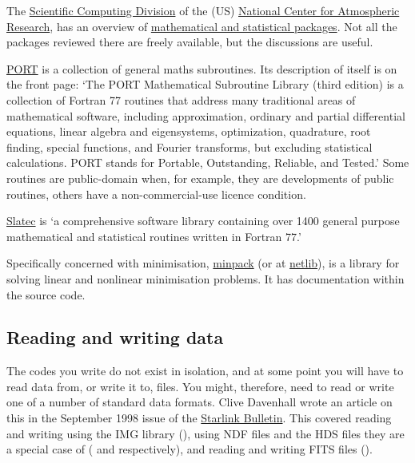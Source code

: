 \documentclass[11pt,oneside,chapters]{starlink}
\begin{document}
The
\href{http://www.scd.ucar.edu/}{Scientific Computing Division}
of the (US)
\href{http://www.ncar.ucar.edu/}{National Center for Atmospheric Research},
has an overview of
\href{http://www.scd.ucar.edu/softlib/mathlib.html}{mathematical and statistical packages}.
Not all the packages
reviewed there are freely available, but the discussions are
useful.

\href{http://www.bell-labs.com/project/PORT/}{PORT}
is a collection of general maths subroutines.  Its description of
itself is on the front page: `The
PORT Mathematical Subroutine Library (third edition) is a
collection of Fortran 77 routines that address many
traditional areas of mathematical software, including
approximation, ordinary and partial differential equations,
linear algebra and eigensystems, optimization, quadrature,
root finding, special functions, and Fourier transforms, but
excluding statistical calculations. PORT stands for Portable,
Outstanding, Reliable, and Tested.'
Some routines are public-domain when, for example, they are
developments of public routines, others have a
non-commercial-use licence condition.

\href{http://www.hensa.ac.uk/netlib/slatec/index.html}{Slatec}
is `a comprehensive software library containing over 1400
general purpose mathematical and statistical routines
written in Fortran 77.'

Specifically concerned with minimisation,
\href{http://www.hensa.ac.uk/netlib/minpack/}{minpack}
(or at \href{http://www.netlib.org/minpack/}{netlib}), is a
library for solving linear and nonlinear minimisation
problems.  It has documentation within the source code.

\subsection{Reading and writing data}
\label{s:rwdata}


The codes you write do not exist in isolation, and at
some point you will have to read data from, or write it
to, files.  You might, therefore, need to read or write
one of a number of standard data formats.  Clive Davenhall
wrote an article on this in the September 1998 issue of the
\href{http://www.starlink.ac.uk/bulletin/98sep/node12.html}{Starlink Bulletin}.
This covered reading and writing using
the IMG library (),
using NDF files and the HDS files they are a special case
of ( and  respectively),
and reading and writing FITS files
().
\end{document}
